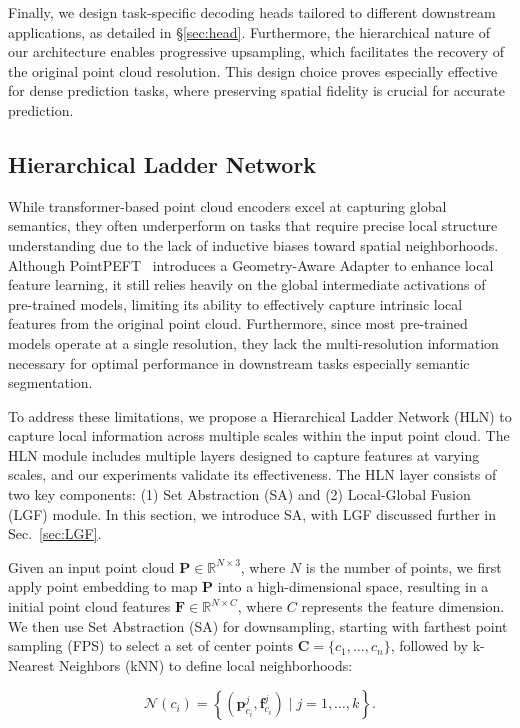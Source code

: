 Finally, we design task-specific decoding heads tailored to different downstream applications, as detailed in \S\ref{sec:head}. Furthermore, the hierarchical nature of our architecture enables progressive upsampling, which facilitates the recovery of the original point cloud resolution. This design choice proves especially effective for dense prediction tasks, where preserving spatial fidelity is crucial for accurate prediction.

\subsection{Hierarchical Ladder Network}
\label{sec:HLN}
While transformer-based point cloud encoders excel at capturing global semantics, they often underperform on tasks that require precise local structure understanding due to the lack of inductive biases toward spatial neighborhoods. Although PointPEFT~\cite{tang2024point} introduces a Geometry-Aware Adapter to enhance local feature learning, it still relies heavily on the global intermediate activations of pre-trained models, limiting its ability to effectively capture intrinsic local features from the original point cloud. Furthermore, since most pre-trained models operate at a single resolution, they lack the multi-resolution information necessary for optimal performance in downstream tasks especially semantic segmentation.

To address these limitations, we propose a Hierarchical Ladder Network (HLN) to capture local information across multiple scales within the input point cloud. The HLN module includes multiple layers designed to capture features at varying scales, and our experiments validate its effectiveness. The HLN layer consists of two key components: (1) Set Abstraction (SA) and (2) Local-Global Fusion (LGF) module. In this section, we introduce SA, with LGF discussed further in Sec.~\ref{sec:LGF}.

Given an input point cloud $\mathbf{P} \in \mathbb{R}^{N \times 3}$, where $N$ is the number of points, we first apply point embedding to map $\mathbf{P}$ into a high-dimensional space, resulting in a initial point cloud features $\mathbf{F} \in \mathbb{R}^{N \times C}$, where $C$ represents the feature dimension. We then use Set Abstraction (SA) for downsampling, starting with farthest point sampling (FPS) to select a set of center points $\mathbf{C}=\{c_1, \ldots, c_n\}$, followed by k-Nearest Neighbors (kNN) to define local neighborhoods: 

\begin{equation}
    \mathcal{N}(c_i) = \left\{(\mathbf{p}_{c_i}^j, \mathbf{f}_{c_i}^j) \mid j = 1, \dots, k \right\}.
\end{equation}

